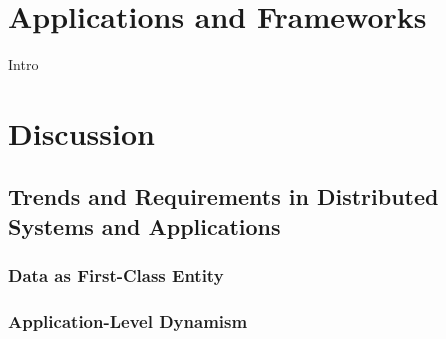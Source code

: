 \documentclass[a4paper,10pt]{article}
\begin{document}
\section{Applications and Frameworks}
\label{apps_and_frameworks}

Intro

\section{Discussion}

\subsection{Trends and Requirements in Distributed Systems and Applications}

\subsubsection{Data as First-Class Entity}

\subsubsection{Application-Level Dynamism}

 

\end{document}
